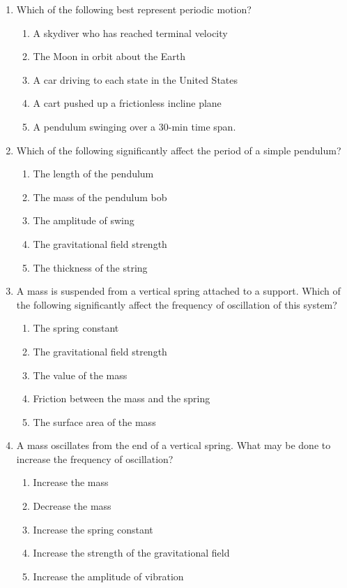 \documentclass{../../../oss-apphys}
\begin{document}
\begin{multicols}{2}
\begin{enumerate}[leftmargin=18pt,resume]
  \item Which of the following best represent periodic motion?
    \begin{enumerate}[noitemsep,topsep=0pt,leftmargin=18pt,label=(\Alph*)]
    \item A skydiver who has reached terminal velocity
    \item The Moon in orbit about the Earth
    \item A car driving to each state in the United States
    \item A cart pushed up a frictionless incline plane
    \item A pendulum swinging over a 30-min time span.
    \end{enumerate}
    
  \item  Which of the following significantly affect the period of a simple
    pendulum?
    \begin{enumerate}[noitemsep,topsep=0pt,leftmargin=18pt,label=(\Alph*)]
    \item The length of the pendulum
    \item The mass of the pendulum bob
    \item The amplitude of swing
    \item The gravitational field strength
    \item The thickness of the string
    \end{enumerate}
    
  \item A mass is suspended from a vertical spring attached to a support. Which
    of the following significantly affect the frequency of oscillation of this
    system?
    \begin{enumerate}[noitemsep,topsep=0pt,leftmargin=18pt,label=(\Alph*)]
    \item The spring constant
    \item The gravitational field strength
    \item The value of the mass
    \item Friction between the mass and the spring
    \item The surface area of the mass
    \end{enumerate}
    
  \item A mass oscillates from the end of a vertical spring. What may be done
    to increase the frequency of oscillation?
    \label{multi-last}
    \begin{enumerate}[noitemsep,topsep=0pt,leftmargin=18pt,label=(\Alph*)]
    \item Increase the mass
    \item Decrease the mass
    \item Increase the spring constant
    \item Increase the strength of the gravitational field
    \item Increase the amplitude of vibration
    \end{enumerate}
  \end{enumerate}
\end{multicols}
\end{document}
